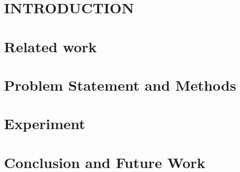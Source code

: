 \documentclass[letterpaper,10pt,conference]{ieeeconf}
\begin{document}
\section{INTRODUCTION}
\label{sec:introduction}


\section{Related work}
\label{sec:related_works}

\section{Problem Statement and Methods}\label{sec:method}



\section{Experiment}
\label{sec:experiment}
\label{sec4:expriments}

\section{Conclusion and Future Work}
\label{sec:conclusion}












\end{document}
